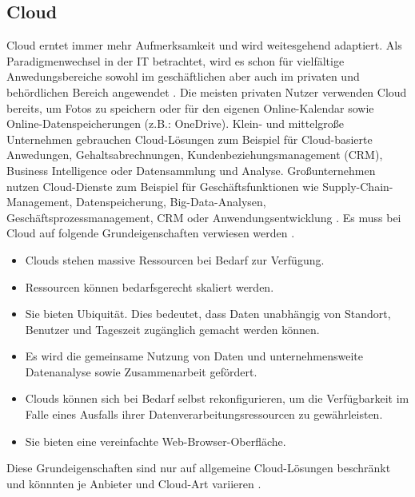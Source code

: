\documentclass[12pt,bibtotoc]{article}
\begin{document}
		\subsection{Cloud}
		Cloud erntet immer mehr Aufmerksamkeit und wird weitesgehend adaptiert. Als Paradigmenwechsel in der IT betrachtet, wird es schon für vielfältige Anwedungsbereiche sowohl im geschäftlichen aber auch im privaten und behördlichen Bereich angewendet \cite{Murugesan.2016}.
		\newline
		Die meisten privaten Nutzer verwenden Cloud bereits, um Fotos zu speichern oder für den eigenen Online-Kalendar sowie Online-Datenspeicherungen (z.B.: OneDrive). \newline 
		Klein- und mittelgroße Unternehmen gebrauchen Cloud-Lösungen zum Beispiel für Cloud-basierte Anwedungen, Gehaltsabrechnungen, Kundenbeziehungsmanagement (CRM), Business Intelligence oder Datensammlung und Analyse. \newline
		Großunternehmen nutzen Cloud-Dienste zum Beispiel für Geschäftsfunktionen wie Supply-Chain-Management, Datenspeicherung, Big-Data-Analysen, Geschäftsprozessmanagement, CRM oder Anwendungsentwicklung \cite{Murugesan.2016}.
		\newline
			Es muss bei Cloud auf folgende Grundeigenschaften verwiesen werden \cite{Murugesan.2016}.
			\begin{itemize}
				\item Clouds stehen massive Ressourcen bei Bedarf zur Verfügung.
				\item Ressourcen können bedarfsgerecht skaliert werden.
				\item Sie bieten Ubiquität. Dies bedeutet, dass Daten unabhängig von Standort, Benutzer und Tageszeit zugänglich gemacht werden können.
				\item Es wird die gemeinsame Nutzung von Daten und unternehmensweite Datenanalyse sowie Zusammenarbeit gefördert.
				\item Clouds können sich bei Bedarf selbst rekonfigurieren, um die Verfügbarkeit im Falle eines Ausfalls ihrer Datenverarbeitungsressourcen zu gewährleisten.
				\item Sie bieten eine vereinfachte Web-Browser-Oberfläche.
			\end{itemize}
		Diese Grundeigenschaften sind nur auf allgemeine Cloud-Lösungen beschränkt und könnnten je Anbieter und Cloud-Art variieren \cite{Murugesan.2016}.
		\newpage
\end{document}
